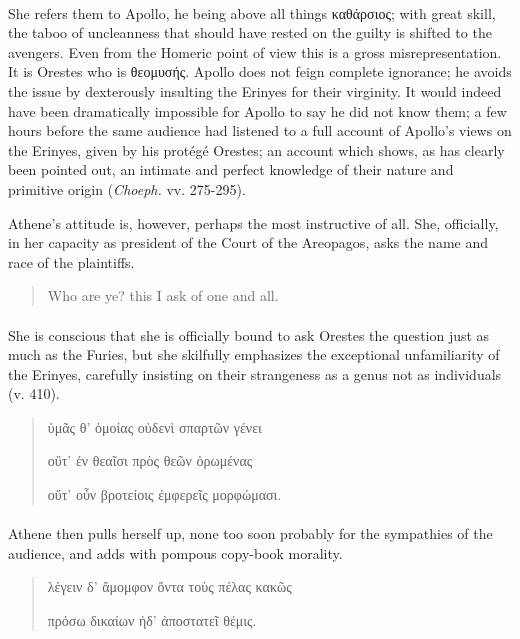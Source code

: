 \documentclass[a4paper, 11pt, oneside, polutonikogreek, english]{article}
\begin{document}
\paragraph{}
She refers them to Apollo, he being above all things καθάρσιος; with great skill, the taboo of uncleanness that should have rested on the guilty is shifted to the avengers. Even from the Homeric point of view this is a gross misrepresentation. It is Orestes who is θεομυσής. Apollo does not feign complete ignorance; he avoids the issue by dexterously insulting the Erinyes for their virginity. It would indeed have been dramatically impossible for Apollo to say he did not know them; a few hours before the same audience had listened to a full account of Apollo's views on the Erinyes, given by his protégé Orestes; an account which shows, as has clearly been pointed out, an intimate and perfect knowledge of their nature and primitive origin (\emph{Choeph.} vv. 275-295).

Athene's attitude is, however, perhaps the most instructive of all. She, officially, in her capacity as president of the Court of the Areopagos, asks the name and race of the plaintiffs.
\begin{quotation}
\large
Who are ye? this I ask of one and all.
\end{quotation}
\paragraph{}
She is conscious that she is officially bound to ask Orestes the question just as much as the Furies, but she skilfully emphasizes the exceptional unfamiliarity of the Erinyes, carefully insisting on their strangeness as a genus not as individuals (v. 410).
\begin{quotation}
\large
ὑμᾶς θ' ὁμοίας οὐδενὶ σπαρτῶν γένει

οὔτ' ἐν θεαῖσι πρὸς θεῶν ὁρωμένας

οὔτ' οὖν βροτείοις ἐμφερεῖς μορφώμασι.
\end{quotation}
\paragraph{}
Athene then pulls herself up, none too soon probably for the sympathies of the audience, and adds with pompous copy-book morality.
\begin{quotation}
\large
λέγειν δ' ἄμομφον ὄντα τοὺς πέλας κακῶς

πρόσω δικαίων ἠδ' ἀποστατεῖ θέμις.
\end{quotation}
\end{document}
